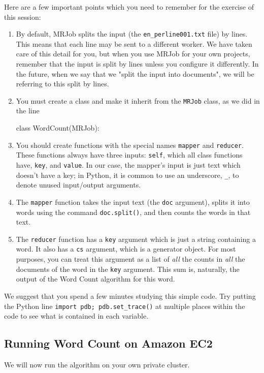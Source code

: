 Here are a few important points which you need to remember for the exercise of this session:
%
\begin{enumerate}
	\item By default, MRJob splits the input (the \texttt{en\_perline001.txt} file) by lines. This means that each line may be sent to a different worker. We have taken care of this detail for you, but when you use MRJob for your own projects, remember that the input is split by lines unless you configure it differently. In the future, when we say that we "split the input into documents", we will be referring to this split by lines.
	\item You must create a class and make it inherit from the \texttt{MRJob} class, as we did in the line 	
\begin{python}
	class WordCount(MRJob):
\end{python}
	\item You should create functions with the special names \texttt{mapper} and \texttt{reducer}. These functions always have three inputs: \texttt{self}, which all class functions have, \texttt{key}, and \texttt{value}. In our case, the mapper's input is just text which doesn't have a key; in Python, it is common to use an underscore, \texttt{\_}, to denote unused input/output arguments.
	\item The \texttt{mapper} function takes the input text (the \texttt{doc} argument), splits it into words using the command \texttt{doc.split()}, and then counts the words in that text.
	\item The \texttt{reducer} function has a \texttt{key} argument which is just a string containing a word. It also has a \texttt{cs} argument, which is a generator object. For most purposes, you can treat this argument as a list of \emph{all} the counts in \emph{all} the documents of the word in the \texttt{key} argument. This sum is, naturally, the output of the Word Count algorithm for this word.
\end{enumerate}

We suggest that you spend a few minutes studying this simple code. Try putting the Python line \texttt{import pdb; pdb.set\_trace()} at multiple places within the code to see what is contained in each variable.

\subsection{Running Word Count on Amazon EC2}
We will now run the algorithm on your own private cluster.

